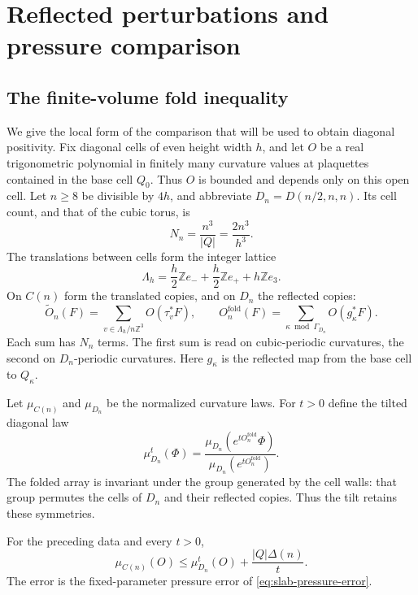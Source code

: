 \documentclass[11pt,letterpaper,reqno]{amsart}
\newcommand{\Z}{\mathbb Z}
\begin{document}
\section{Reflected perturbations and pressure comparison}\label{sec:diagonal-positivity}

\subsection{The finite-volume fold inequality}\label{subsec:slab-finite-fold}

We give the local form of the comparison that will be used to obtain
diagonal positivity. Fix diagonal cells of even height width $h$,
and let $O$ be a real trigonometric polynomial in finitely many
curvature values at plaquettes contained in the base cell $Q_0$.
Thus $O$ is bounded and depends only on this open cell. Let $n\ge8$
be divisible by $4h$, and abbreviate $D_n=D(n/2,n,n)$. Its cell
count, and that of the cubic torus, is
\[
 N_n=\frac{n^3}{|Q|}=\frac{2n^3}{h^3}.
\]
The translations between cells form the integer lattice
\[
 \Lambda_h=\frac h2\Z e_-+\frac h2\Z e_++h\Z e_3.
\]
On $C(n)$ form the translated copies, and on $D_n$ the reflected
copies:
\begin{equation}\label{eq:slab-two-arrays}
 \widetilde O_n(F)=\sum_{v\in\Lambda_h/n\Z^3}O(\tau_v^*F),
 \qquad O_n^{\mathrm{fold}}(F)=\sum_{\kappa\bmod\Gamma_{D_n}}
                                                O(g_\kappa^*F).
\end{equation}
Each sum has $N_n$ terms. The first sum is read on cubic-periodic
curvatures, the second on $D_n$-periodic curvatures. Here $g_\kappa$
is the reflected map from the base cell to $Q_\kappa$.

Let $\mu_{C(n)}$ and $\mu_{D_n}$ be the normalized curvature laws.
For $t>0$ define the tilted diagonal law
\begin{equation}\label{eq:slab-tilted-law}
 \mu_{D_n}^t(\Phi)=
 \frac{\mu_{D_n}(e^{tO_n^{\mathrm{fold}}}\Phi)}
      {\mu_{D_n}(e^{tO_n^{\mathrm{fold}}})}.
\end{equation}
The folded array is invariant under the group generated by the cell
walls: that group permutes the cells of $D_n$ and their reflected
copies. Thus the tilt retains these symmetries.

\begin{proposition}\label{prop:slab-finite-fold}
For the preceding data and every $t>0$,
\begin{equation}\label{eq:slab-finite-fold}
 \mu_{C(n)}(O)\le\mu_{D_n}^t(O)+\frac{|Q|\Delta(n)}{t}.
\end{equation}
The error is the fixed-parameter pressure error of
\eqref{eq:slab-pressure-error}.
\end{proposition}
\end{document}
